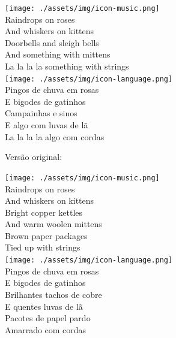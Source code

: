 \bigskip
\begin{tcolorbox}[enhanced,
    drop fuzzy shadow southeast, boxrule=0.3pt,
    lower separated=false, sidebyside, sidebyside align=top,
    halign=flush right, halign lower=left,
    colframe=black!30!dialogoBorder,colback=musicaBg]
\texttt{[image: ./assets/img/icon-music.png]}\\
Raindrops on roses\\And whiskers on kittens\\Doorbells and sleigh bells\\And something with mittens\\La la la la something with strings\\
\tcblower
\texttt{[image: ./assets/img/icon-language.png]}\\
Pingos de chuva em rosas\\E bigodes de gatinhos\\Campainhas e sinos\\E algo com luvas de lã\\La la la la algo com cordas\\
\end{tcolorbox}

Versão original:

\bigskip
\begin{tcolorbox}[enhanced,
    drop fuzzy shadow southeast, boxrule=0.3pt,
    lower separated=false, sidebyside, sidebyside align=top,
    halign=flush right, halign lower=left,
    colframe=black!30!dialogoBorder,colback=musicaBg]
\texttt{[image: ./assets/img/icon-music.png]}\\
Raindrops on roses\\And whiskers on kittens\\Bright copper kettles\\And warm woolen mittens\\Brown paper packages\\Tied up with strings\\
\tcblower
\texttt{[image: ./assets/img/icon-language.png]}\\
Pingos de chuva em rosas\\E bigodes de gatinhos\\Brilhantes tachos de cobre\\E quentes luvas de lã\\Pacotes de papel pardo\\Amarrado com cordas\\
\end{tcolorbox}

